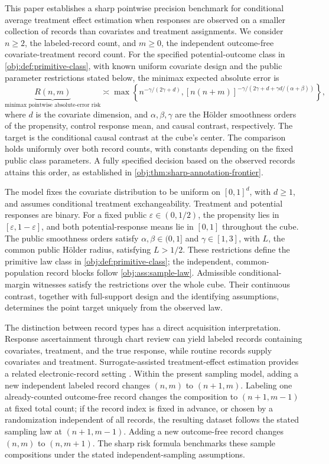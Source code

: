 \documentclass[11pt]{article}
\begin{document}
This paper establishes a sharp pointwise precision benchmark for conditional average treatment effect estimation when responses are observed on a smaller collection of records than covariates and treatment assignments. We consider \(n\ge2\), the labeled-record count, and \(m\ge0\), the independent outcome-free covariate-treatment record count. For the specified potential-outcome class in \cref{obj:def:primitive-class}, with known uniform covariate design and the public parameter restrictions stated below, the minimax expected absolute error is
\[
\underbrace{R(n,m)}_{\text{minimax pointwise absolute-error risk}}
\asymp
\max\left\{
n^{-\gamma/(2\gamma+d)},
[n(n+m)]^{-\gamma/(2\gamma+d+\gamma d/(\alpha+\beta))}
\right\},
\]
where \(d\) is the covariate dimension, and \(\alpha,\beta,\gamma\) are the Hölder smoothness orders of the propensity, control response mean, and causal contrast, respectively. The target is the conditional causal contrast at the cube's center. The comparison holds uniformly over both record counts, with constants depending on the fixed public class parameters. A fully specified decision based on the observed records attains this order, as established in \cref{obj:thm:sharp-annotation-frontier}.

The model fixes the covariate distribution to be uniform on \([0,1]^d\), with \(d\ge1\), and assumes conditional treatment exchangeability. Treatment and potential responses are binary. For a fixed public \(\varepsilon\in(0,1/2)\), the propensity lies in \([\varepsilon,1-\varepsilon]\), and both potential-response means lie in \([0,1]\) throughout the cube. The public smoothness orders satisfy \(\alpha,\beta\in(0,1]\) and \(\gamma\in[1,3]\), with \(L\), the common public Hölder radius, satisfying \(L>1/2\). These restrictions define the primitive law class in \cref{obj:def:primitive-class}; the independent, common-population record blocks follow \cref{obj:ass:sample-law}. Admissible conditional-margin witnesses satisfy the restrictions over the whole cube. Their continuous contrast, together with full-support design and the identifying assumptions, determines the point target uniquely from the observed law.

The distinction between record types has a direct acquisition interpretation. Response ascertainment through chart review can yield labeled records containing covariates, treatment, and the true response, while routine records supply covariates and treatment. Surrogate-assisted treatment-effect estimation provides a related electronic-record setting \citep[Sections 2.1, 2.5--2.6, and 4]{ChengAnanthakrishnanCai2021}. Within the present sampling model, adding a new independent labeled record changes \((n,m)\) to \((n+1,m)\). Labeling one already-counted outcome-free record changes the composition to \((n+1,m-1)\) at fixed total count; if the record index is fixed in advance, or chosen by a randomization independent of all records, the resulting dataset follows the stated sampling law at \((n+1,m-1)\). Adding a new outcome-free record changes \((n,m)\) to \((n,m+1)\). The sharp risk formula benchmarks these sample compositions under the stated independent-sampling assumptions.
\end{document}
